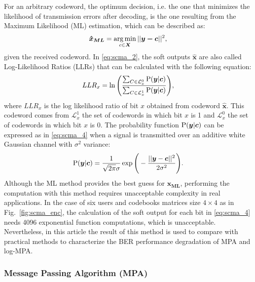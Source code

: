 For an arbitrary codeword, the optimum decision, i.e. the one that minimizes the
likelihood of transmission errors after decoding, is the one resulting from the
Maximum Likelihood (ML) estimation, which can be described as:
\begin{equation}
  \label{eq:scma_2}
  \bm{\hat{x}_{ML}} = \operatorname*{arg\,min}_{c \in \bm{X}}||\bm{y - c}||^2,
\end{equation}
given the received codeword. In \eqref{eq:scma_2}, the soft outputs
$\hat{\bm{x}}$ are also called Log-Likelihood Ratios (LLRs) that can be
calculated with the following equation:
\begin{equation}
  \label{eq:scma_3}
  LLR_x = \ln\Bigg(\frac{\sum_{C\in\mathcal{L}_x^0} \operatorname{P}(\bm{y}|\bm{c})}
  {\sum_{C\in\mathcal{L}_x^1} \operatorname{P}(\bm{y}|\bm{c})}\Bigg),
\end{equation}
where $LLR_x$ is the log likelihood ratio of bit $x$ obtained from codeword
$\hat{\bm{x}}$. This codeword comes from $\mathcal{L}_x^1$ the set of codewords
in which bit $x$ is 1 and $\mathcal{L}_x^0$ the set of codewords in which bit
$x$ is 0. The probability function $\operatorname{P}(\bm{y}|\bm{c})$ can be expressed as
in \eqref{eq:scma_4} when a signal is transmitted over an additive white
Gaussian channel with $\sigma^2$ variance:
\begin{equation}
  \label{eq:scma_4}
  \operatorname{P}(\bm{y}|\bm{c}) = \frac{1}{\sqrt{2\pi}\sigma}\exp
  \Bigg(-\frac{||\bm{y}-\bm{c}||^2}{2\sigma^2}\Bigg).
\end{equation}
Although the ML method provides the best guess for $\bm{\hat{x}_{ML}}$,
performing the computation with this method requires unacceptable complexity in
real applications. In the case of six users and codebooks matrices size
$4\times4$ as in Fig.~\ref{fig:scma_enc}, the calculation of the soft output
for each bit in \eqref{eq:scma_4} needs 4096 exponential function computations,
which is unacceptable. Nevertheless, in this article the result of this method
is used to compare with practical methods to characterize the BER performance
degradation of MPA and log-MPA.

\subsubsection{Message Passing Algorithm (MPA)}
\label{sec:scma_mpa}

